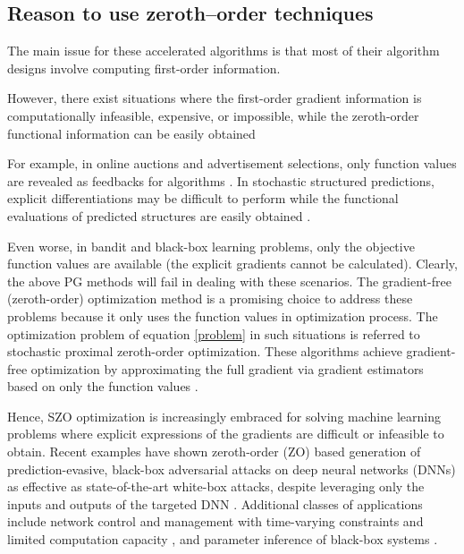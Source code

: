 \documentclass{article}
\theoremstyle{definition}
\theoremstyle{remark}
\begin{document}
\subsection{Reason to use zeroth--order techniques}
{\color{DarkOrchid}
The main issue for these accelerated algorithms is that most of their algorithm designs involve computing first-order information. 
}
{\color{Green}
{\color{RubineRed}
However, there exist situations where the first-order gradient information is computationally infeasible, expensive, or impossible,
while the zeroth-order functional information can be easily obtained
}

{\color{RubineRed}
 For example, in online auctions and advertisement
selections, only function values are revealed as feedbacks for algorithms \cite{wibisono2012finite}. In stochastic structured predictions, explicit differentiations may be difficult to perform while the functional evaluations of predicted structures are easily obtained \cite{sokolov2016stochastic}. }

 Even worse, in bandit \cite{shamir2017optimal} and black-box learning \cite{chen2017zoo} problems, only the objective function values are available (the explicit gradients cannot be calculated). 
Clearly, the above
PG methods will fail in dealing with these scenarios. The gradient-free (zeroth-order) optimization method \cite{nesterov2017random} is a promising choice to address these problems because it only uses the function values in optimization process. 
{\color{RubineRed} The optimization problem of equation \eqref{problem} in such situations is referred to stochastic proximal zeroth-order optimization.}
{\color{Brown} These algorithms achieve gradient-free optimization by approximating the full gradient via gradient estimators based on only the function values \cite{brent2013algorithms,spall2005introduction}.} 
}
{\color{Brown}
Hence, SZO optimization is increasingly embraced for solving machine learning
problems where explicit expressions of the gradients are difficult or infeasible to obtain. Recent examples have shown zeroth-order (ZO) based generation of prediction-evasive, black-box adversarial attacks on deep neural networks (DNNs) as effective as state-of-the-art white-box attacks, despite leveraging only the inputs and outputs of the targeted DNN \cite{papernot2017practical,madry2017towards,chen2017zoo} {\color{Green} \cite{conn2009introduction}}. Additional classes of applications include network control and management with time-varying constraints and limited computation capacity \cite{chen2019bandit,liu2017zeroth}, and parameter inference of black-box systems \cite{fu2002optimization,lian2016comprehensive}. 
}
\end{document}
